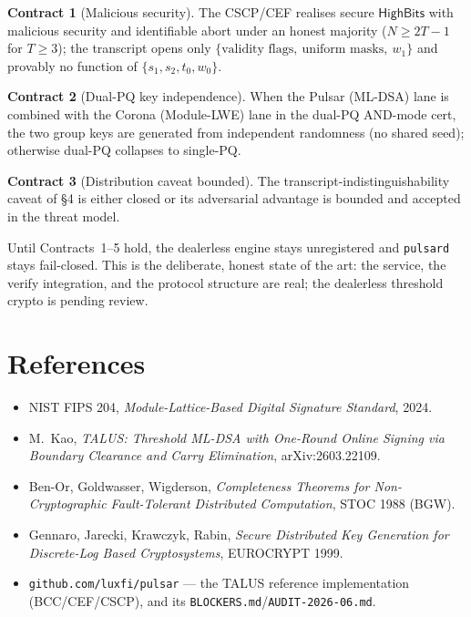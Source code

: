 \documentclass[11pt]{article}
\newcommand{\HighBits}{\mathsf{HighBits}}
\theoremstyle{definition}
\newtheorem{contract}{Contract}
\theoremstyle{plain}
\begin{document}
\begin{contract}[Malicious security]
The CSCP/CEF realises secure \(\HighBits\) with malicious security and
identifiable abort under an honest majority (\(N\ge 2T-1\) for \(T\ge 3\)); the
transcript opens only \(\{\text{validity flags},\ \text{uniform masks},\ w_1\}\)
and provably no function of \(\{s_1,s_2,t_0,w_0\}\).
\end{contract}

\begin{contract}[Dual-PQ key independence]
When the Pulsar (ML-DSA) lane is combined with the Corona (Module-LWE) lane in
the dual-PQ AND-mode cert, the two group keys are generated from independent
randomness (no shared seed); otherwise dual-PQ collapses to single-PQ.
\end{contract}

\begin{contract}[Distribution caveat bounded]
The transcript-indistinguishability caveat of \S4 is either closed or its
adversarial advantage is bounded and accepted in the threat model.
\end{contract}

Until Contracts~1--5 hold, the dealerless engine stays unregistered and
\texttt{pulsard} stays fail-closed. This is the deliberate, honest state of the
art: the service, the verify integration, and the protocol structure are real;
the dealerless threshold crypto is pending review.

\section*{References}
\begin{itemize}[leftmargin=1.6em]
  \item NIST FIPS 204, \emph{Module-Lattice-Based Digital Signature Standard}, 2024.
  \item M.~Kao, \emph{TALUS: Threshold ML-DSA with One-Round Online Signing via
  Boundary Clearance and Carry Elimination}, arXiv:2603.22109.
  \item Ben-Or, Goldwasser, Wigderson, \emph{Completeness Theorems for
  Non-Cryptographic Fault-Tolerant Distributed Computation}, STOC 1988 (BGW).
  \item Gennaro, Jarecki, Krawczyk, Rabin, \emph{Secure Distributed Key
  Generation for Discrete-Log Based Cryptosystems}, EUROCRYPT 1999.
  \item \texttt{github.com/luxfi/pulsar} --- the TALUS reference implementation
  (BCC/CEF/CSCP), and its \texttt{BLOCKERS.md}/\texttt{AUDIT-2026-06.md}.
\end{itemize}
\end{document}
